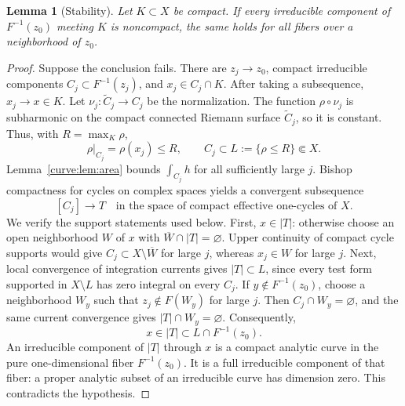 \documentclass[11pt]{amsart}
\newtheorem{lemma}[theorem]{Lemma}
\theoremstyle{definition}
\theoremstyle{remark}
\numberwithin{equation}{section}
\begin{document}
\begin{lemma}[Stability]\label{curve:lem:stability}
Let $K\subset X$ be compact. If every irreducible component of
$F^{-1}(z_0)$ meeting $K$ is noncompact, the same holds for all
fibers over a neighborhood of $z_0$.
\end{lemma}
\begin{proof}
Suppose the conclusion fails. There are $z_j\to z_0$, compact
irreducible components $C_j\subset F^{-1}(z_j)$, and
$x_j\in C_j\cap K$. After taking a subsequence, $x_j\to x\in K$.
Let $\nu_j:\widetilde C_j\to C_j$ be the normalization. The function
$\rho\circ\nu_j$ is subharmonic on the compact connected Riemann
surface $\widetilde C_j$, so it is constant. Thus, with
$R=\max_K\rho$,
\[
 \rho|_{C_j}=\rho(x_j)\le R,\qquad
 C_j\subset L:=\{\rho\le R\}\Subset X.
\]
Lemma~\ref{curve:lem:area} bounds $\int_{C_j}h$ for all sufficiently
large $j$. Bishop compactness for cycles on complex spaces
\cite[Theorem~1]{Barlet1999} yields a convergent subsequence
\[
 [C_j]\longrightarrow T\quad\text{in the space of compact
 effective one-cycles of }X.
\]
We verify the support statements used below. First, $x\in|T|$:
otherwise choose an open neighborhood $W$ of $x$ with
$\overline W\cap|T|=\varnothing$. Upper continuity of compact
cycle supports would give $C_j\subset X\setminus\overline W$
for large $j$, whereas $x_j\in W$ for large $j$.
Next, local convergence of integration currents gives $|T|\subset L$,
since every test form supported in $X\setminus L$ has zero integral
on every $C_j$. If $y\notin F^{-1}(z_0)$, choose a neighborhood $W_y$
such that $z_j\notin F(W_y)$ for large $j$. Then
$C_j\cap W_y=\varnothing$, and the same current convergence gives
$|T|\cap W_y=\varnothing$. Consequently,
\[
 x\in|T|\subset L\cap F^{-1}(z_0).
\]
An irreducible component of $|T|$ through $x$ is a compact analytic
curve in the pure one-dimensional fiber $F^{-1}(z_0)$. It is a full
irreducible component of that fiber: a proper analytic subset of an
irreducible curve has dimension zero. This contradicts the hypothesis.
\end{proof}
\end{document}

